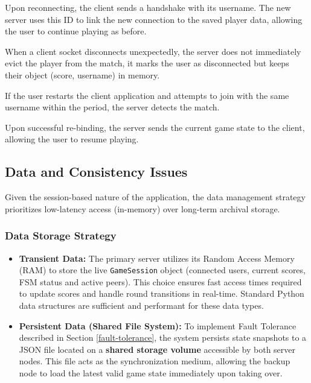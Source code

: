 \documentclass{scrartcl}
\begin{document}
Upon reconnecting, the client sends a handshake with its username. 
The new server uses this ID to link the new connection to the saved player data, 
allowing the user to continue playing as before.

When a client socket disconnects unexpectedly, 
the server does not immediately evict the player from the match, 
it marks the user as disconnected but keeps their object (score, username) 
in memory.
    
If the user restarts the client application
and attempts to join with the same username within the period, 
the server detects the match.
    
Upon successful re-binding, the server sends the current game state to the client, allowing the user to
resume playing.

\subsection{Data and Consistency Issues}\label{data-and-consistency-issues}

Given the session-based nature of the application, 
the data management strategy prioritizes low-latency access (in-memory) 
over long-term archival storage.

\subsubsection*{Data Storage Strategy}

\begin{itemize}
    \item \textbf{Transient Data:}
    The primary server utilizes its Random Access Memory (RAM) to store 
    the live \texttt{GameSession} object (connected users, current scores, FSM status and active peers).
    This choice ensures fast access times required to update scores and handle round transitions in real-time. 
    Standard Python data structures are sufficient and performant for these data types.

    \item \textbf{Persistent Data (Shared File System):}
    To implement Fault Tolerance described in Section \ref{fault-tolerance}, 
    the system persists state snapshots to a JSON file located on a \textbf{shared storage volume} accessible by both server nodes.
    This file acts as the synchronization medium, allowing the backup node to load the latest valid game state immediately upon taking over.
\end{itemize}
\end{document}
